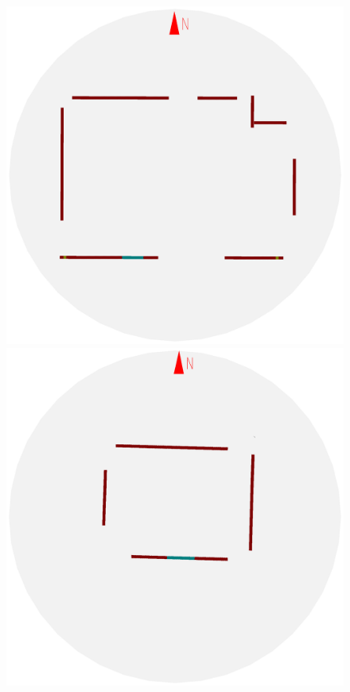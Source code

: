 \begin{figure}[t]
\begin{center}
\begin{minipage}[b]{0.72\textwidth}
  \includegraphics[width=\figwidth]{f2_10_2D_walls_rotate} %
  \includegraphics[width=\figwidth]{f2_11_2D_walls_rotate} %
\end{minipage}

\end{center}
\end{figure}
